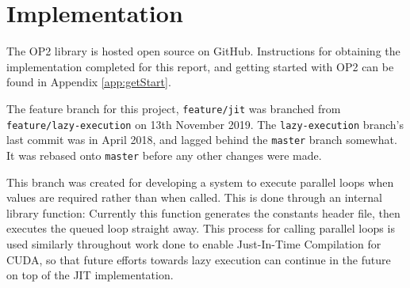 
\section{Implementation}
\label{s:impl}
The OP2 library is hosted open source on GitHub\cite{OP2rep}. Instructions for obtaining the implementation completed for this report, and getting started with OP2 can be found in Appendix \ref{app:getStart}.
\par
The feature branch for this project, \verb|feature/jit| was branched from \\\verb|feature/lazy-execution| on 13th November 2019. The \verb|lazy-execution| branch's last commit was in April 2018, and lagged behind the \verb|master| branch somewhat. It was rebased onto \verb|master| before any other changes were made.
\par
This branch was created for developing a system to execute parallel loops when values are required rather than when called. This is done through an internal library function:
Currently this function generates the constants header file, then executes the queued loop straight away. This process for calling parallel loops is used similarly throughout work done to enable Just-In-Time Compilation for CUDA, so that future efforts towards lazy execution can continue in the future on top of the JIT implementation.

